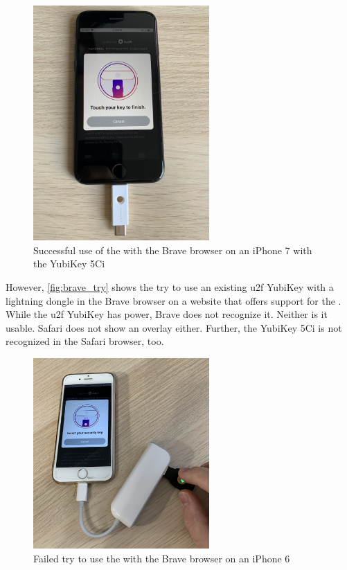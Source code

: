 \begin{figure}[hbt]
	\centering
	\includegraphics[width=0.6\textwidth]{pics/brave_success_5ci.eps}
	\caption[Successful use of the \wa{} with the Brave browser on an iPhone 7 with the YubiKey 5Ci]{Successful use of the \wa{} with the Brave browser on an iPhone 7 with the YubiKey 5Ci\footnotemark}
	\label{fig:brave_success}
\end{figure}

However, \autoref{fig:brave_try} shows the try to use an existing \gls{u2f} YubiKey with a lightning dongle in the Brave browser on a website that offers support for the \wa. While the \gls{u2f} YubiKey has power, Brave does not recognize it. Neither is it usable. Safari does not show an overlay either. Further, the YubiKey 5Ci is not recognized in the Safari browser, too.

\begin{figure}[hbt]
	\centering
	\includegraphics[width=0.6\textwidth]{pics/brave_try_dongle.eps}
	\caption[Failed try to use the \wa{} with the Brave browser on an iPhone 6]{Failed try to use the \wa{} with the Brave browser on an iPhone 6\footnotemark}
	\label{fig:brave_try}
\end{figure}

